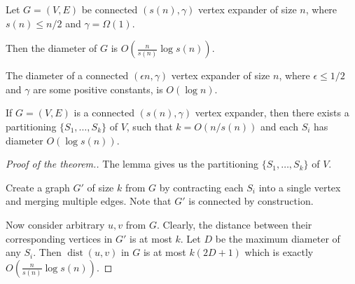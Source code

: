 \documentclass{beamer}
\DeclareMathOperator*{\dist}{dist}
\newcommand{\autotitle}{\secname\ifdefempty{\subsecname}{}{~--- \subsecname}}
\begin{document}
\begin{frame}{\autotitle}
    \small
    \begin{theorem}
        Let $G=(V,E)$ be connected $(s(n),\gamma)$ vertex expander of size $n$,
        where $s(n)\leq n/2$ and $\gamma=\Omega(1)$.
        
        Then the diameter of $G$ is $O\left(\frac{n}{s(n)}\log s(n)\right)$.
    \end{theorem}
    \begin{corollary}
        The diameter of a connected $(\epsilon n,\gamma)$ vertex expander of size $n$,
        where $\epsilon\leq1/2$ and $\gamma$ are some positive constants, is $O(\log n)$.
    \end{corollary}
    \begin{lemma}
        If $G=(V,E)$ is a connected $(s(n),\gamma)$ vertex expander,
        then there exists a partitioning $\{S_1,\ldots,S_k\}$ of $V$,
        such that $k=O(n/s(n))$ and each $S_i$ has diameter $O(\log s(n))$.
    \end{lemma}
\end{frame}

\begin{frame}{\autotitle}
    \begin{proof}[Proof of the theorem.]
        The lemma gives us the partitioning $\{S_1,\ldots,S_k\}$ of $V$.
        
        Create a graph $G'$ of size $k$ from $G$ by contracting each $S_i$
        into a single vertex and merging multiple edges.
        Note that $G'$ is connected by construction.
        
        Now consider arbitrary $u,v$ from $G$. Clearly, the distance between
        their corresponding vertices in $G'$ is at most $k$.
        Let $D$ be the maximum diameter of any $S_i$.
        Then $\dist(u,v)$ in $G$ is at most $k(2D+1)$
        which is exactly $O\left(\frac{n}{s(n)}\log s(n)\right)$.
    \end{proof}
\end{frame}
\end{document}
